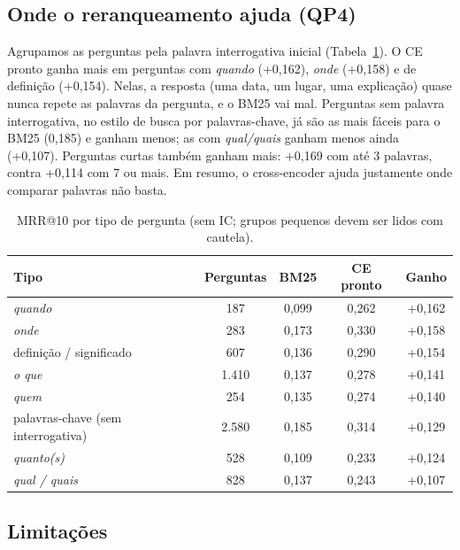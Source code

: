 \documentclass[12pt]{article}
\begin{document}
\subsection{Onde o reranqueamento ajuda (QP4)}

Agrupamos as perguntas pela palavra interrogativa inicial (Tabela~\ref{tab:tipos}). O CE pronto
ganha mais em perguntas com \textit{quando} (+0,162), \textit{onde} (+0,158) e de definição
(+0,154). Nelas, a resposta (uma data, um lugar, uma explicação) quase nunca repete as palavras
da pergunta, e o BM25 vai mal. Perguntas sem palavra interrogativa, no estilo de busca por
palavras-chave, já são as mais fáceis para o BM25 (0,185) e ganham menos; as com
\textit{qual/quais} ganham menos ainda (+0,107). Perguntas curtas também ganham mais: +0,169
com até 3 palavras, contra +0,114 com 7 ou mais. Em resumo, o cross-encoder ajuda justamente
onde comparar palavras não basta.

\begin{table}[ht]
\centering
\caption{MRR@10 por tipo de pergunta (sem IC; grupos pequenos devem ser lidos com cautela).}
\label{tab:tipos}
\begin{tabular}{lcccc}
\toprule
Tipo & Perguntas & BM25 & CE pronto & Ganho \\
\midrule
\textit{quando} & 187 & 0,099 & 0,262 & +0,162 \\
\textit{onde} & 283 & 0,173 & 0,330 & +0,158 \\
definição / significado & 607 & 0,136 & 0,290 & +0,154 \\
\textit{o que} & 1.410 & 0,137 & 0,278 & +0,141 \\
\textit{quem} & 254 & 0,135 & 0,274 & +0,140 \\
palavras-chave (sem interrogativa) & 2.580 & 0,185 & 0,314 & +0,129 \\
\textit{quanto(s)} & 528 & 0,109 & 0,233 & +0,124 \\
\textit{qual / quais} & 828 & 0,137 & 0,243 & +0,107 \\
\bottomrule
\end{tabular}
\end{table}

\FloatBarrier
\subsection{Limitações}
\end{document}
